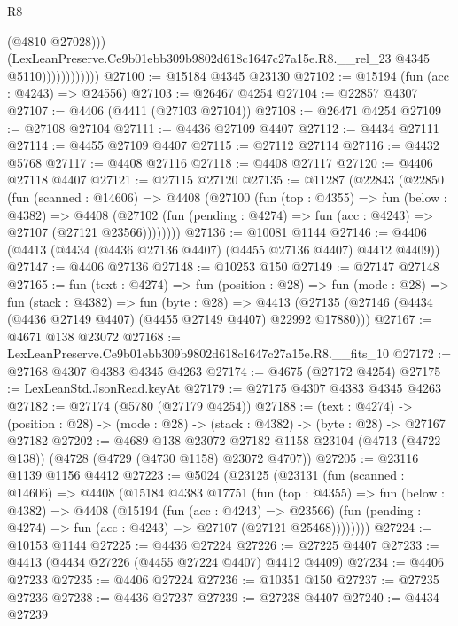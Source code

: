 \begin{lexlean}{R8}
\begin{coremodule}
                              (@4810 @27028)))
                          (LexLeanPreserve.Ce9b01ebb309b9802d618c1647c27a15e.R8.__rel_23
                            @4345
                            @5110))))))))))))
@27100 := @15184 @4345 @23130
@27102 := @15194 (fun (acc : @4243) => @24556)
@27103 := @26467 @4254
@27104 := @22857 @4307
@27107 := @4406 (@4411 (@27103 @27104))
@27108 := @26471 @4254
@27109 := @27108 @27104
@27111 := @4436 @27109 @4407
@27112 := @4434 @27111
@27114 := @4455 @27109 @4407
@27115 := @27112 @27114
@27116 := @4432 @5768
@27117 := @4408 @27116
@27118 := @4408 @27117
@27120 := @4406 @27118 @4407
@27121 := @27115 @27120
@27135 := @11287
    (@22843
      (@22850
        (fun (scanned : @14606) =>
        @4408
          (@27100
            (fun (top : @4355) =>
            fun (below : @4382) =>
            @4408
              (@27102 (fun (pending : @4274) => fun (acc : @4243) => @27107 (@27121 @23566))))))))
@27136 := @10081 @1144
@27146 := @4406 (@4413 (@4434 (@4436 @27136 @4407) (@4455 @27136 @4407) @4412 @4409))
@27147 := @4406 @27136
@27148 := @10253 @150
@27149 := @27147 @27148
@27165 := fun (text : @4274) =>
  fun (position : @28) =>
  fun (mode : @28) =>
  fun (stack : @4382) =>
  fun (byte : @28) =>
  @4413 (@27135 (@27146 (@4434 (@4436 @27149 @4407) (@4455 @27149 @4407) @22992 @17880)))
@27167 := @4671 @138 @23072
@27168 := LexLeanPreserve.Ce9b01ebb309b9802d618c1647c27a15e.R8.__fits_10
@27172 := @27168 @4307 @4383 @4345 @4263
@27174 := @4675 (@27172 @4254)
@27175 := LexLeanStd.JsonRead.keyAt
@27179 := @27175 @4307 @4383 @4345 @4263
@27182 := @27174 (@5780 (@27179 @4254))
@27188 := (text : @4274) ->
  (position : @28) -> (mode : @28) -> (stack : @4382) -> (byte : @28) -> @27167 @27182
@27202 := @4689
    @138
    @23072
    @27182
    @1158
    @23104
    (@4713 (@4722 @138))
    (@4728 (@4729 (@4730 @1158) @23072 @4707))
@27205 := @23116 @1139 @1156 @4412
@27223 := @5024
    (@23125
      (@23131
        (fun (scanned : @14606) =>
        @4408
          (@15184
            @4383
            @17751
            (fun (top : @4355) =>
            fun (below : @4382) =>
            @4408
              (@15194
                (fun (acc : @4243) => @23566)
                (fun (pending : @4274) => fun (acc : @4243) => @27107 (@27121 @25468))))))))
@27224 := @10153 @1144
@27225 := @4436 @27224
@27226 := @27225 @4407
@27233 := @4413 (@4434 @27226 (@4455 @27224 @4407) @4412 @4409)
@27234 := @4406 @27233
@27235 := @4406 @27224
@27236 := @10351 @150
@27237 := @27235 @27236
@27238 := @4436 @27237
@27239 := @27238 @4407
@27240 := @4434 @27239

\end{coremodule}
\end{lexlean}
